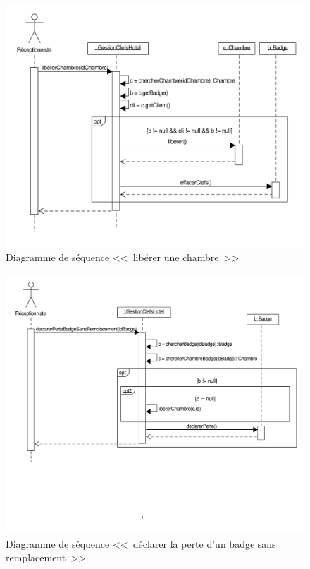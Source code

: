 \documentclass[11pt,article]{article}
\begin{document}
\begin{figure}[h!]
\begin{center}
\includegraphics[scale=0.5]{DiagrammesDeSequence/gestionclefshotel_uml_diag_seq_liberer_chambre}
\caption{Diagramme de séquence <<~libérer une chambre~>>}
\end{center}
\label{umlet_diag_classes}
\end{figure}

\begin{figure}[h!]
\begin{center}
\includegraphics[scale=0.5]{DiagrammesDeSequence/gestionclefshotel_uml_diag_seq_declarer_perte_badge_sans_remplacement}
\caption{Diagramme de séquence <<~déclarer la perte d'un badge sans remplacement~>>}
\end{center}
\label{umlet_diag_classes}
\end{figure}
\end{document}
